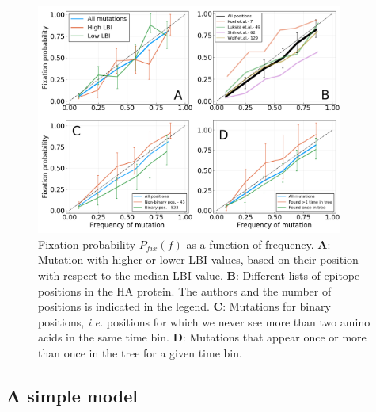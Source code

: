 \documentclass{article}
\begin{document}
	\begin{figure}
		\centering
		\includegraphics[width=0.9\textwidth]{./Figures/Panel4.png}
		\caption{Fixation probability $P_{fix}(f)$ as a function of frequency. \textbf{A}: Mutation with higher or lower LBI values, based on their position with respect to the median LBI value. \textbf{B}: Different lists of epitope positions in the HA protein. The authors and the number of positions is indicated in the legend. \textbf{C}: Mutations for binary positions, \emph{i.e.} positions for which we never see more than two amino acids in the same time bin. \textbf{D}: Mutations that appear once or more than once in the tree for a given time bin.}
		\label{fig:panel4}
	\end{figure}

	\subsection*{A simple model}
	\label{sub:a_simple_model}
\end{document}
